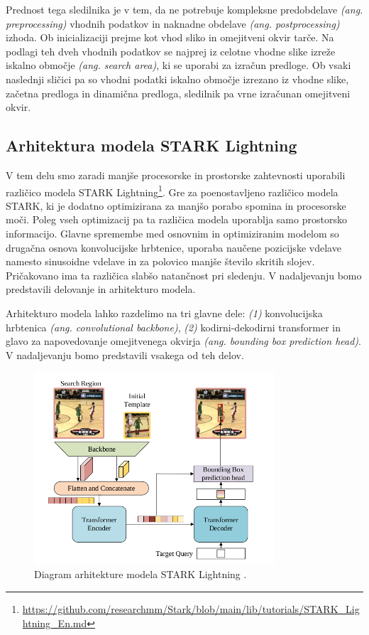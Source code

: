 \documentclass[a4paper,12pt,openright]{book}
\begin{document}
Prednost tega sledilnika je v tem, da ne potrebuje kompleksne predobdelave \emph{(ang. preprocessing)} vhodnih podatkov in naknadne obdelave \emph{(ang. postprocessing)} izhoda. Ob inicializaciji prejme kot vhod sliko in omejitveni okvir tarče. Na podlagi teh dveh vhodnih podatkov se najprej iz celotne vhodne slike izreže iskalno območje \emph{(ang. search area)}, ki se uporabi za izračun predloge. Ob vsaki naslednji sličici pa so vhodni podatki iskalno območje izrezano iz vhodne slike, začetna predloga in dinamična predloga, sledilnik pa vrne izračunan omejitveni okvir.

\subsection{Arhitektura modela STARK Lightning}
V tem delu smo zaradi manjše procesorske in prostorske zahtevnosti uporabili različico modela STARK Lightning\footnote{\url{https://github.com/researchmm/Stark/blob/main/lib/tutorials/STARK\_Lightning\_En.md}}. Gre za poenostavljeno različico modela STARK, ki je dodatno optimizirana za manjšo porabo spomina in procesorske moči. Poleg vseh optimizacij pa ta različica modela uporablja samo prostorsko informacijo. Glavne spremembe med osnovnim in optimiziranim modelom so drugačna osnova konvolucijske hrbtenice, uporaba naučene pozicijske vdelave namesto sinusoidne vdelave in za polovico manjše število skritih slojev. Pričakovano ima ta različica slabšo natančnost pri sledenju. V nadaljevanju bomo predstavili delovanje in arhitekturo modela.

Arhitekturo modela lahko razdelimo na tri glavne dele: \emph{(1)} konvolucijska hrbtenica \emph{(ang. convolutional backbone)}, \emph{(2)} kodirni-dekodirni transformer in glavo za napovedovanje omejitvenega okvirja \emph{(ang. bounding box prediction head)}. V nadaljevanju bomo predstavili vsakega od teh delov.


\begin{figure}[htb]
    \begin{center}
        \includegraphics[width=0.8\textwidth]{img/stark.png}
    \end{center}
    \caption{Diagram arhitekture modela STARK Lightning \cite{attention_is_all_you_need}.}
    \label{img:stark}
\end{figure}
\end{document}
